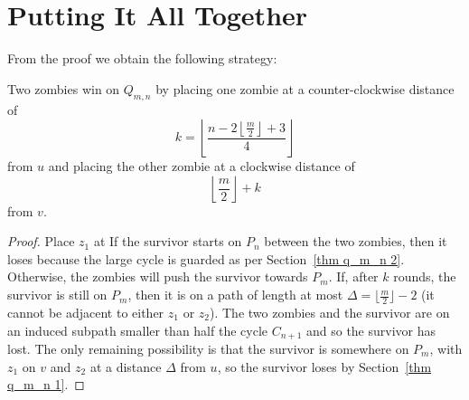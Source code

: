 \section{Putting It All Together}\label{thm q_m_n 4}
From the proof we obtain the following strategy:
\begin{corollary}
  Two zombies win on $Q_{m,n}$ by placing one zombie at a counter-clockwise distance of
  \[ k = \left\lfloor \frac{n - 2 \left\lfloor\frac{m}{2}\right\rfloor +3}{4} \right\rfloor \]
  from $u$ and placing the other zombie at a clockwise distance of
  \[ \left\lfloor \frac{m}{2} \right\rfloor + k \]
  from $v$.
\end{corollary}
\begin{proof}
  Place $z_1$ at
  If the survivor starts on $P_n$ between the two zombies, then it loses because the large cycle is guarded as per Section~\ref{thm q_m_n 2}.
  Otherwise, the zombies will push the survivor towards $P_m$.
  If, after $k$ rounds, the survivor is still on $P_m$, then it is on a path of length at most $\Delta = \lfloor \frac{m}{2} \rfloor - 2$ (it cannot be adjacent to either $z_1$ or $z_2$). The two zombies and the survivor are on an induced subpath smaller than half the cycle $C_{n+1}$ and so the survivor has lost.
  The only remaining possibility is that the survivor is somewhere on $P_m$, with $z_1$ on $v$ and $z_2$ at a distance $\Delta$ from $u$, so the survivor loses by Section~\ref{thm q_m_n 1}.
\end{proof}
